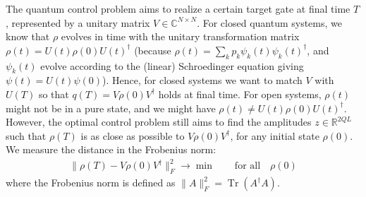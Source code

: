 \documentclass[letterpaper]{article}
\DeclareMathOperator{\Tr}{Tr}
\newcommand{\R}{\mathds{R}}
\newcommand{\C}{\mathds{C}}
\begin{document}
The quantum control problem aims to realize a certain target gate at final time $T$, represented by a unitary matrix $V\in \C^{N\times N}$. For closed quantum systems, we know that $\rho$ evolves in time with the unitary transformation matrix $\rho(t) = U(t)\rho(0) U(t)^{\dagger}$ (because $\rho(t) = \sum_k p_k \psi_k(t)\psi_k(t)^{\dagger}$, and $\psi_k(t)$ evolve according to the (linear) Schroedinger equation giving $\psi(t) = U(t) \psi(0)$). Hence, for closed systems we want to match $V$ with $U(T)$ so that $q(T) = V\rho(0)V^{\dagger}$ holds at final time. For open systems, $\rho(t)$ might not be in a pure state, and we might have $\rho(t) \neq U(t)\rho(0) U(t)^{\dagger}$. However, the optimal control problem still aims to find the amplitudes $z\in \R^{2QL}$ such that $\rho(T)$ is as close as possible to $V\rho(0)V^{\dagger}$, for any initial state $\rho(0)$. We measure the distance in the Frobenius norm:
\begin{align}\label{optimproblem_matrix}
 \| \rho(T) - V\rho(0)V^{\dagger} \|^2_F \rightarrow \min  \qquad \text{for all} \quad \rho(0)
\end{align} 
where the Frobenius norm is defined as $\|A\|^2_F = \Tr(A^{\dagger}A)$.
\end{document}
